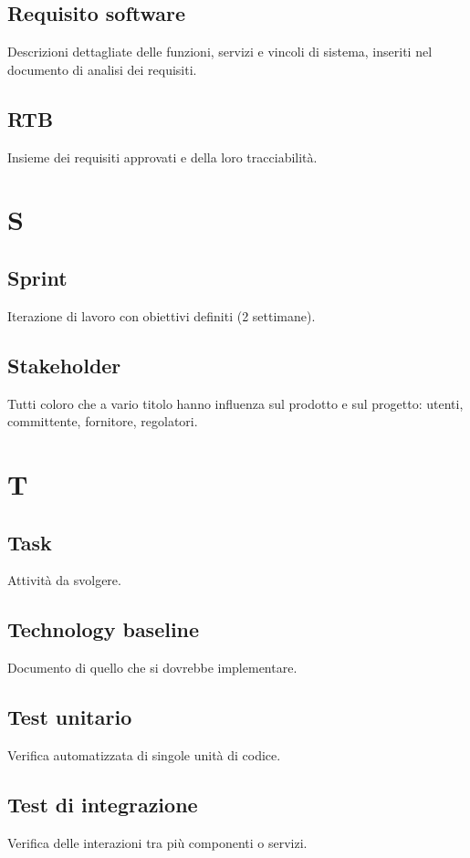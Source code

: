 \documentclass[a4paper,12pt]{article}
\begin{document}
\subsection{Requisito software}
Descrizioni dettagliate delle funzioni, servizi e vincoli di sistema, inseriti nel documento di analisi dei requisiti.

\subsection{RTB}
Insieme dei requisiti approvati e della loro tracciabilità.

\section{S}

\subsection{Sprint}
Iterazione di lavoro con obiettivi definiti (2 settimane).

\subsection{Stakeholder}
Tutti coloro che a vario titolo hanno influenza sul prodotto e sul progetto: utenti, committente, fornitore, regolatori.

\section{T}

\subsection{Task}
Attività da svolgere.

\subsection{Technology baseline}
Documento di quello che si dovrebbe implementare.

\subsection{Test unitario}
Verifica automatizzata di singole unità di codice.

\subsection{Test di integrazione}
Verifica delle interazioni tra più componenti o servizi.
\end{document}
